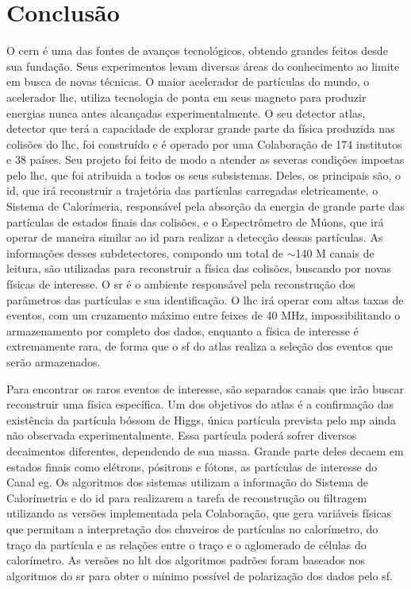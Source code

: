 \chapter{Conclusão}

O \gls{cern} é uma das fontes de avanços tecnológicos, obtendo grandes feitos
desde sua fundação. Seus experimentos
levam diversas áreas do conhecimento ao limite em busca de novas técnicas. 
O maior acelerador de partículas do mundo, o acelerador \gls{lhc}, utiliza
tecnologia de ponta em seus magneto para produzir energias nunca antes
alcançadas experimentalmente. O seu detector \gls{atlas}, detector que terá a
capacidade de explorar grande parte da física produzida nas colisões do
\gls{lhc}, foi construído e é operado por uma Colaboração de 174 institutos e 38 
países. Seu projeto foi feito de modo a atender as severas condições impostas
pelo \gls{lhc}, que foi atribuida a todos os seus subsistemas. Deles, os principais são, 
o \gls{id}, que irá reconstruir a trajetória das partículas carregadas 
eletricamente, o Sistema de Calorímeria, responsável pela absorção da energia 
de grande parte das partículas de estados finais das colisões, e o Espectrômetro de 
Múons, que irá operar de maneira similar ao \gls{id} para realizar a detecção 
dessas partículas. As informações desses subdetectores, compondo um total de
$\sim$140 M canais de leitura, são utilizadas para reconstruir a física das colisões, 
buscando por novas físicas de interesse. O
\glsdesc{sr} é o ambiente responsável pela reconstrução dos parâmetros das
partículas e sua identificação. O \gls{lhc} irá operar com altas
taxas de eventos, com um cruzamento máximo entre feixes de 40 MHz,
impossibilitando o armazenamento por completo dos dados, enquanto
a física de interesse é extremamente rara, de forma que o \glsdesc{sf} do
\gls{atlas} realiza a seleção dos eventos que serão armazenados.

Para encontrar os raros eventos de interesse, são separados canais que irão
buscar reconstruir uma física específica. Um dos objetivos do \gls{atlas} é a
confirmação das existência da partícula bóssom de Higgs, única partícula
prevista pelo \gls{mp} ainda não observada experimentalmente. Essa partícula
poderá sofrer diversos decaimentos diferentes, dependendo de sua massa. Grande
parte deles decaem em estados finais como elétrons, pósitrons e fótons, as
partículas de interesse do Canal \gls{eg}. Os algoritmos dos sistemas
utilizam a informação do Sistema de Calorímetria e do \gls{id} para realizarem a
tarefa de reconstrução ou filtragem utilizando as versões implementada pela
Colaboração, que gera variáveis físicas que permitam a interpretação dos
chuveiros de partículas no calorímetro, do traço da partícula e as relações
entre o traço e o aglomerado de células do calorímetro. As versões no \gls{hlt}
dos algoritmos padrões foram baseados nos algoritmos do \gls{sr} para obter o
mínimo possível de polarização dos dados pelo \gls{sf}.

